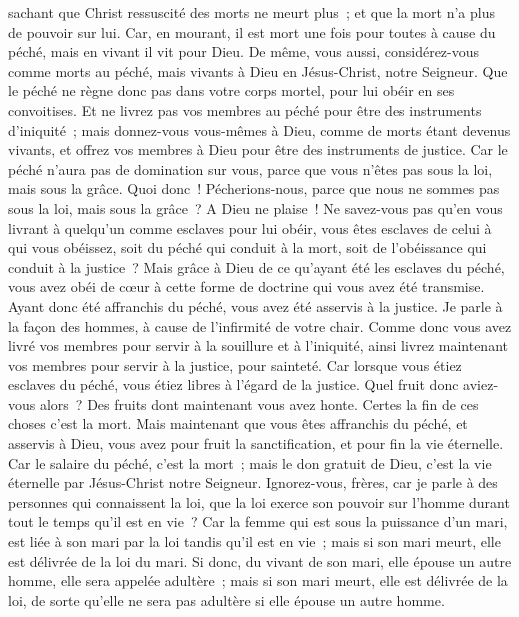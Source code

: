 \begin{multicols}{2}
sachant que Christ ressuscité des morts ne meurt plus~; et que la mort n'a plus de pouvoir sur lui.
Car, en mourant, il est mort une fois pour toutes à cause du péché, mais en vivant il vit pour Dieu.
De même, vous aussi, considérez-vous comme morts au péché, mais vivants à Dieu en Jésus-Christ, notre Seigneur.
Que le péché ne règne donc pas dans votre corps mortel, pour lui obéir en ses convoitises.
Et ne livrez pas vos membres au péché pour être des instruments d'iniquité~; mais donnez-vous vous-mêmes à Dieu, comme de morts étant devenus vivants, et offrez vos membres à Dieu pour être des instruments de justice.
Car le péché n'aura pas de domination sur vous, parce que vous n'êtes pas sous la loi, mais sous la grâce.
Quoi donc~! Pécherions-nous, parce que nous ne sommes pas sous la loi, mais sous la grâce~? A Dieu ne plaise~!
Ne savez-vous pas qu'en vous livrant à quelqu'un comme esclaves pour lui obéir, vous êtes esclaves de celui à qui vous obéissez, soit du péché qui conduit à la mort, soit de l'obéissance qui conduit à la justice~?
Mais grâce à Dieu de ce qu'ayant été les esclaves du péché, vous avez obéi de cœur à cette forme de doctrine qui vous avez été transmise.
Ayant donc été affranchis du péché, vous avez été asservis à la justice.
Je parle à la façon des hommes, à cause de l'infirmité de votre chair. Comme donc vous avez livré vos membres pour servir à la souillure et à l'iniquité, ainsi livrez maintenant vos membres pour servir à la justice, pour sainteté.
Car lorsque vous étiez esclaves du péché, vous étiez libres à l'égard de la justice.
Quel fruit donc aviez-vous alors~? Des fruits dont maintenant vous avez honte. Certes la fin de ces choses c'est la mort.
Mais maintenant que vous êtes affranchis du péché, et asservis à Dieu, vous avez pour fruit la sanctification, et pour fin la vie éternelle.
Car le salaire du péché, c'est la mort~; mais le don gratuit de Dieu, c'est la vie éternelle par Jésus-Christ notre Seigneur.
\VerseOne{}Ignorez-vous, frères, car je parle à des personnes qui connaissent la loi, que la loi exerce son pouvoir sur l'homme durant tout le temps qu'il est en vie~?
Car la femme qui est sous la puissance d'un mari, est liée à son mari par la loi tandis qu'il est en vie~; mais si son mari meurt, elle est délivrée de la loi du mari.
Si donc, du vivant de son mari, elle épouse un autre homme, elle sera appelée adultère~; mais si son mari meurt, elle est délivrée de la loi, de sorte qu'elle ne sera pas adultère si elle épouse un autre homme.

\end{multicols}
